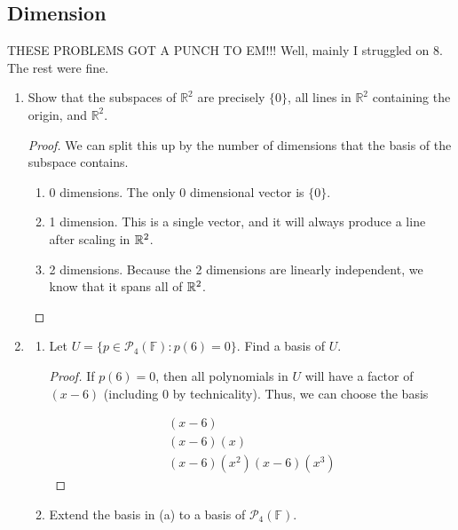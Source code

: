 \subsection{Dimension}

THESE PROBLEMS GOT A PUNCH TO EM!!! Well, mainly I struggled on 8. The rest were fine.

\begin{enumerate}
    \item Show that the subspaces of $\mathbb{R}^2$ are precisely $\{0\}$, all lines in $\mathbb{R}^2$ containing the origin, and $\mathbb{R}^2$.
    

    \begin{proof}
        We can split this up by the number of dimensions that the basis of the subspace contains. 

        \begin{enumerate}
            \item 0 dimensions. The only 0 dimensional vector is $\{0\}$.
            \item 1 dimension. This is a single vector, and it will always produce a line after scaling in $\mathbb{R}^2$. 
            \item 2 dimensions. Because the 2 dimensions are linearly independent, we know that it spans all of $\mathbb{R}^2$.
        \end{enumerate}
    \end{proof}


    \item[3] 
        \begin{enumerate}
            \item Let $U = \{p \in \mathcal{P}_4(\mathbb{F}) : p(6) = 0\}$. Find a basis of $U$.
            
            \begin{proof}
                If $p(6) = 0$, then all polynomials in $U$ will have a factor of $(x-6)$ (including 0 by technicality). Thus, we can choose the basis 

                \begin{align*}
                    (x - 6) \\
                    (x - 6)(x) \\
                    (x - 6)(x^2)
                    (x-6)(x^3)
                \end{align*}
            \end{proof}
            \item Extend the basis in (a) to a basis of $\mathcal{P}_4(\mathbb{F})$.
            

\end{enumerate}
\end{enumerate}
